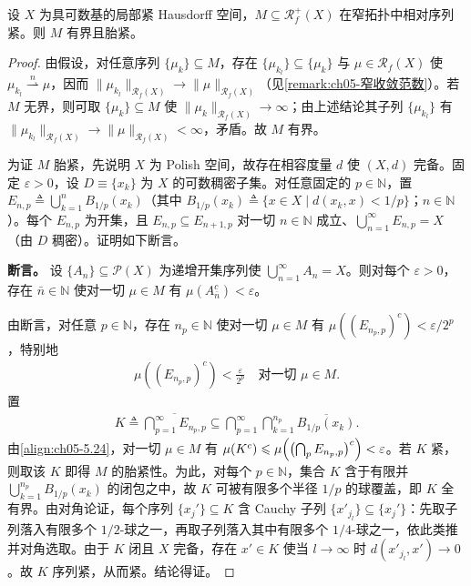 \documentclass[../../main.tex]{subfiles}%
\begin{document}
\begin{proposition}[Ulam]\label{proposition:ch05-ulam}
设 $X$ 为具可数基的局部紧 Hausdorff 空间，$M\subseteq\mathscr{R}^+_f(X)$ 在窄拓扑中相对序列紧。则 $M$ 有界且胎紧。
\end{proposition}

\begin{proof}
由假设，对任意序列 $\{\mu_k\}\subseteq M$，存在 $\{\mu_{k_l}\}\subseteq\{\mu_k\}$ 与 $\mu\in\mathscr{R}_f(X)$ 使 $\mu_{k_l}\stackrel{n}{\rightharpoonup}\mu$，因而 $\|\mu_{k_l}\|_{\mathscr{R}_f(X)}\to\|\mu\|_{\mathscr{R}_f(X)}$（见\cref{remark:ch05-窄收敛范数}）。若 $M$ 无界，则可取 $\{\mu_k\}\subseteq M$ 使 $\|\mu_k\|_{\mathscr{R}_f(X)}\to\infty$；由上述结论其子列 $\{\mu_{k_l}\}$ 有 $\|\mu_{k_l}\|_{\mathscr{R}_f(X)}\to\|\mu\|_{\mathscr{R}_f(X)}<\infty$，矛盾。故 $M$ 有界。

为证 $M$ 胎紧，先说明 $X$ 为 Polish 空间，故存在相容度量 $d$ 使 $(X,d)$ 完备。固定 $\varepsilon>0$，设 $D\equiv\{x_k\}$ 为 $X$ 的可数稠密子集。对任意固定的 $p\in\mathbb{N}$，置 $E_{n,p}\triangleq \bigcup_{k=1}^n B_{1/p}(x_k)$（其中 $B_{1/p}(x_k)\triangleq \{x\in X\mid d(x_k,x)<1/p\}$；$n\in\mathbb{N}$）。每个 $E_{n,p}$ 为开集，且 $E_{n,p}\subseteq E_{n+1,p}$ 对一切 $n\in\mathbb{N}$ 成立、$\bigcup_{n=1}^\infty E_{n,p}=X$（由 $D$ 稠密）。证明如下断言。

\textbf{断言。} 设 $\{A_n\}\subseteq\mathcal{P}(X)$ 为递增开集序列使 $\bigcup_{n=1}^\infty A_n=X$。则对每个 $\varepsilon>0$，存在 $\bar{n}\in\mathbb{N}$ 使对一切 $\mu\in M$ 有 $\mu(A_{\bar{n}}^c)<\varepsilon$。

由断言，对任意 $p\in\mathbb{N}$，存在 $n_p\in\mathbb{N}$ 使对一切 $\mu\in M$ 有 $\mu((E_{n_p,p})^c)<\varepsilon/2^p$，特别地
\begin{align}
\mu((E_{n_p,p})^c)<\frac{\varepsilon}{2^p}
\quad\text{对一切 }\mu\in M.\label{align:ch05-5.24}
\end{align}
置
\begin{align*}
K\triangleq \overline{\bigcap_{p=1}^\infty E_{n_p,p}}
\subseteq\bigcap_{p=1}^\infty\bigcap_{k=1}^{n_p}\overline{B_{1/p}(x_k)}.
\end{align*}
由\eqref{align:ch05-5.24}，对一切 $\mu\in M$ 有 $\mu(K^c)\leqslant\mu\Bigl(\bigl(\bigcap_{p}E_{n_p,p}\bigr)^c\Bigr)<\varepsilon$。若 $K$ 紧，则取该 $K$ 即得 $M$ 的胎紧性。为此，对每个 $p\in\mathbb{N}$，集合 $K$ 含于有限并 $\bigcup_{k=1}^{n_p}B_{1/p}(x_k)$ 的闭包之中，故 $K$ 可被有限多个半径 $1/p$ 的球覆盖，即 $K$ 全有界。由对角论证，每个序列 $\{x_j'\}\subseteq K$ 含 Cauchy 子列 $\{x'_{j_l}\}\subseteq\{x_j'\}$：先取子列落入有限多个 $1/2$-球之一，再取子列落入其中有限多个 $1/4$-球之一，依此类推并对角选取。由于 $K$ 闭且 $X$ 完备，存在 $x'\in K$ 使当 $l\to\infty$ 时 $d(x'_{j_l},x')\to0$。故 $K$ 序列紧，从而紧。结论得证。


\end{proof}
\end{document}
